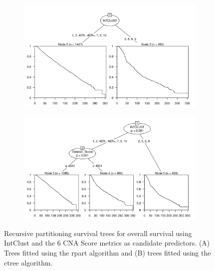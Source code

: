 \begin{figure}[!htb]
\centering

\vspace{0.5cm}

\begin{subfigure}{\textwidth}
\subcaption{}
\includegraphics[width=1\textwidth]{../figures/Appendices/Appendix_B/PartyKit_Survival_Score_OS_INTCLUST.png}
\end{subfigure}

\vspace{2cm}

\begin{subfigure}{\textwidth}
\subcaption{}
\includegraphics[width=1\textwidth]{../figures/Appendices/Appendix_B/Ctree_Survival_Score_OS_INTCLUST.png}
\end{subfigure}

\vspace{0.5cm}

\caption[Recursive partitioning survival trees for overall survival using IntClust and the 6 CNA Score metrics as candidate predictors.]{Recursive partitioning survival trees for overall survival using IntClust and the 6 CNA Score metrics as candidate predictors. (A) Trees fitted using the rpart algorithm and (B) trees fitted using the ctree algorithm.}
\end{figure}

